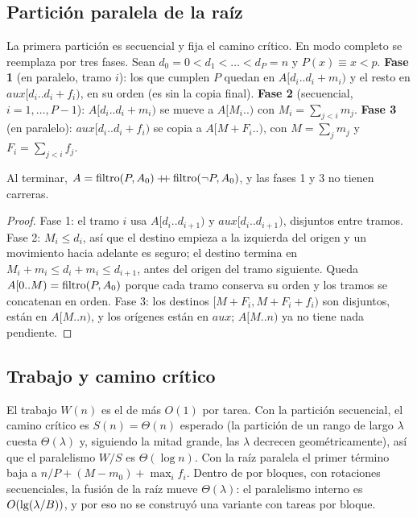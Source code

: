 \subsection{Partición paralela de la raíz}
La primera partición es secuencial y fija el camino crítico. En modo completo se
reemplaza por tres fases. Sean $d_0=0<d_1<\dots<d_P=n$ y $P(x)\equiv x\lt p$.
\textbf{Fase 1} (en paralelo, tramo $i$): los que cumplen $P$ quedan en
$A[d_i..d_i+m_i)$ y el resto en $\mathit{aux}[d_i..d_i+f_i)$, en su orden (es
\PartBloque sin la copia final). \textbf{Fase 2} (secuencial, $i=1,\dots,P-1$):
$A[d_i..d_i+m_i)$ se mueve a $A[M_i..)$ con $M_i=\sum_{j<i}m_j$. \textbf{Fase 3} (en
paralelo): $\mathit{aux}[d_i..d_i+f_i)$ se copia a $A[M+F_i..)$, con $M=\sum_j m_j$ y
$F_i=\sum_{j<i}f_j$.

\begin{lema}\label{lem:raiz}
Al terminar, $A=\operatorname{filtro}(P,A_0)\mathbin{+\!\!+}\operatorname{filtro}(\neg P,A_0)$, y las fases 1 y 3 no tienen
carreras.
\end{lema}
\begin{proof}
Fase 1: el tramo $i$ usa $A[d_i..d_{i+1})$ y $\mathit{aux}[d_i..d_{i+1})$, disjuntos
entre tramos. Fase 2: $M_i\le d_i$, así que el destino empieza a la izquierda del origen
y un movimiento hacia adelante es seguro; el destino termina en
$M_i+m_i\le d_i+m_i\le d_{i+1}$, antes del origen del tramo siguiente. Queda
$A[0..M)=\operatorname{filtro}(P,A_0)$ porque cada tramo conserva su orden y los tramos se concatenan en
orden. Fase 3: los destinos $[M+F_i,M+F_i+f_i)$ son disjuntos, están en $A[M..n)$, y los
orígenes están en $\mathit{aux}$; $A[M..n)$ ya no tiene nada pendiente.
\end{proof}

\subsection{Trabajo y camino crítico}
El trabajo $W(n)$ es el de \Quick más $O(1)$ por tarea. Con la partición secuencial, el
camino crítico es $S(n)=\Theta(n)$ esperado (la partición de un rango de largo $\lambda$
cuesta $\Theta(\lambda)$ y, siguiendo la mitad grande, las $\lambda$ decrecen
geométricamente), así que el paralelismo $W/S$ es $\Theta(\log n)$. Con la raíz paralela
el primer término baja a $n/P+(M-m_0)+\max_i f_i$. Dentro de \Part por bloques, con
rotaciones secuenciales, la fusión de la raíz mueve $\Theta(\lambda)$: el paralelismo
interno es $O(\lg(\lambda/B))$, y por eso no se construyó una variante con tareas por
bloque.

